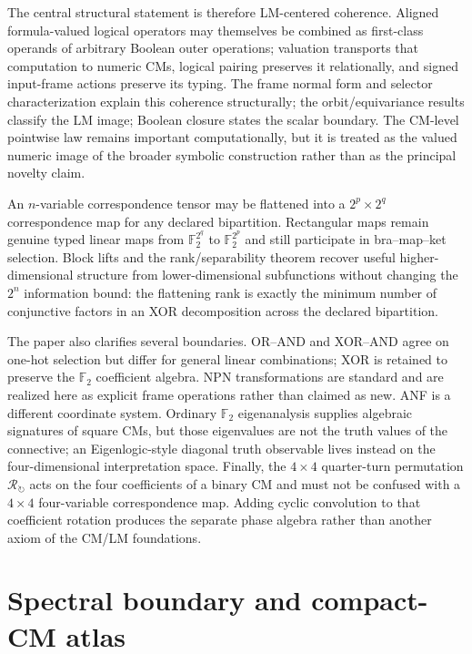 \documentclass[11pt]{article}
\theoremstyle{definition}
\theoremstyle{remark}
\newcommand{\F}{\mathbb F}
\begin{document}
The central structural statement is therefore LM-centered coherence.  Aligned formula-valued logical operators may themselves be combined as first-class operands of arbitrary Boolean outer operations; valuation transports that computation to numeric CMs, logical pairing preserves it relationally, and signed input-frame actions preserve its typing.  The frame normal form and selector characterization explain this coherence structurally; the orbit/equivariance results classify the LM image; Boolean closure states the scalar boundary.  The CM-level pointwise law remains important computationally, but it is treated as the valued numeric image of the broader symbolic construction rather than as the principal novelty claim.

An $n$-variable correspondence tensor may be flattened into a $2^p\times2^q$ correspondence map for any declared bipartition.  Rectangular maps remain genuine typed linear maps from $\F_2^{2^q}$ to $\F_2^{2^p}$ and still participate in bra--map--ket selection.  Block lifts and the rank/separability theorem recover useful higher-dimensional structure from lower-dimensional subfunctions without changing the $2^n$ information bound: the flattening rank is exactly the minimum number of conjunctive factors in an XOR decomposition across the declared bipartition.

The paper also clarifies several boundaries.  OR--AND and XOR--AND agree on one-hot selection but differ for general linear combinations; XOR is retained to preserve the $\F_2$ coefficient algebra.  NPN transformations are standard and are realized here as explicit frame operations rather than claimed as new.  ANF is a different coordinate system.  Ordinary $\F_2$ eigenanalysis supplies algebraic signatures of square CMs, but those eigenvalues are not the truth values of the connective; an Eigenlogic-style diagonal truth observable lives instead on the four-dimensional interpretation space.  Finally, the $4\times4$ quarter-turn permutation $\mathcal R_{\circlearrowright}$ acts on the four coefficients of a binary CM and must not be confused with a $4\times4$ four-variable correspondence map.  Adding cyclic convolution to that coefficient rotation produces the separate phase algebra rather than another axiom of the CM/LM foundations.

\appendix

\section{Spectral boundary and compact-CM atlas}
\label{sec:spectrum}
\end{document}
